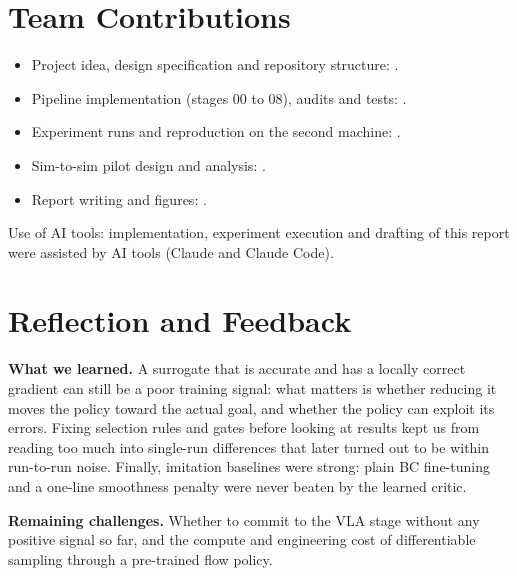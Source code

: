 \section{Team Contributions}

\begin{itemize}[leftmargin=*, itemsep=2pt]
  \item Project idea, design specification and repository structure: .
  \item Pipeline implementation (stages 00 to 08), audits and tests: .
  \item Experiment runs and reproduction on the second machine: .
  \item Sim-to-sim pilot design and analysis: .
  \item Report writing and figures: .
\end{itemize}
Use of AI tools: implementation, experiment execution and drafting of this report were assisted by AI tools (Claude and Claude Code). 

\section{Reflection and Feedback}

\textbf{What we learned.} A surrogate that is accurate and has a locally correct gradient can still be a poor training signal: what matters is whether reducing it moves the policy toward the actual goal, and whether the policy can exploit its errors. Fixing selection rules and gates before looking at results kept us from reading too much into single-run differences that later turned out to be within run-to-run noise. Finally, imitation baselines were strong: plain BC fine-tuning and a one-line smoothness penalty were never beaten by the learned critic.

\textbf{Remaining challenges.} Whether to commit to the VLA stage without any positive signal so far, and the compute and engineering cost of differentiable sampling through a pre-trained flow policy.

